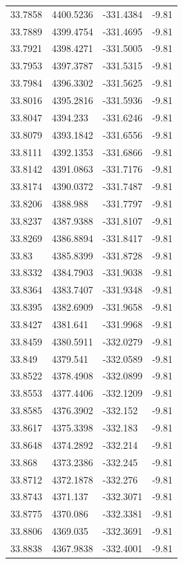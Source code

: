 \begin{table}[H]
\begin{tabular}{llll}
33.7858 & 4400.5236 & -331.4384 & -9.81 \\
33.7889 & 4399.4754 & -331.4695 & -9.81 \\
33.7921 & 4398.4271 & -331.5005 & -9.81 \\
33.7953 & 4397.3787 & -331.5315 & -9.81 \\
33.7984 & 4396.3302 & -331.5625 & -9.81 \\
33.8016 & 4395.2816 & -331.5936 & -9.81 \\
33.8047 & 4394.233 & -331.6246 & -9.81 \\
33.8079 & 4393.1842 & -331.6556 & -9.81 \\
33.8111 & 4392.1353 & -331.6866 & -9.81 \\
33.8142 & 4391.0863 & -331.7176 & -9.81 \\
33.8174 & 4390.0372 & -331.7487 & -9.81 \\
33.8206 & 4388.988 & -331.7797 & -9.81 \\
33.8237 & 4387.9388 & -331.8107 & -9.81 \\
33.8269 & 4386.8894 & -331.8417 & -9.81 \\
33.83 & 4385.8399 & -331.8728 & -9.81 \\
33.8332 & 4384.7903 & -331.9038 & -9.81 \\
33.8364 & 4383.7407 & -331.9348 & -9.81 \\
33.8395 & 4382.6909 & -331.9658 & -9.81 \\
33.8427 & 4381.641 & -331.9968 & -9.81 \\
33.8459 & 4380.5911 & -332.0279 & -9.81 \\
33.849 & 4379.541 & -332.0589 & -9.81 \\
33.8522 & 4378.4908 & -332.0899 & -9.81 \\
33.8553 & 4377.4406 & -332.1209 & -9.81 \\
33.8585 & 4376.3902 & -332.152 & -9.81 \\
33.8617 & 4375.3398 & -332.183 & -9.81 \\
33.8648 & 4374.2892 & -332.214 & -9.81 \\
33.868 & 4373.2386 & -332.245 & -9.81 \\
33.8712 & 4372.1878 & -332.276 & -9.81 \\
33.8743 & 4371.137 & -332.3071 & -9.81 \\
33.8775 & 4370.086 & -332.3381 & -9.81 \\
33.8806 & 4369.035 & -332.3691 & -9.81 \\
33.8838 & 4367.9838 & -332.4001 & -9.81 \\

\end{tabular}
\end{table}
